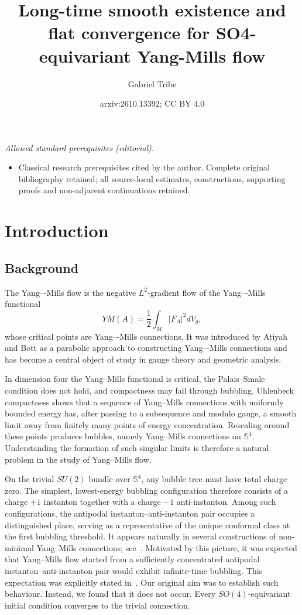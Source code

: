 \documentclass[11pt,a4paper]{article}
\title{Long-time smooth existence and flat convergence for SO4-equivariant Yang-Mills flow}
\author{Gabriel Tribe}
\date{arxiv:2610.13392; CC BY 4.0}
\numberwithin{equation}{section}
\theoremstyle{plain}
\theoremstyle{remark}
\begin{document}
\maketitle
\noindent\textit{Allowed standard prerequisites (editorial).}\begin{itemize}
\item Classical research prerequisites cited by the author. Complete original bibliography retained; all source-local estimates, constructions, supporting proofs and non-adjacent continuations retained.
\end{itemize}\medskip
\section{Introduction}

\subsection{Background}

The Yang–-Mills flow is the negative $L^2$-gradient flow of the Yang–-Mills functional
$$
YM(A)=\frac 1 2\int_M |F_A|^2dV_g,
$$
whose critical points are Yang–-Mills connections. It was introduced by Atiyah and Bott as a parabolic approach to constructing Yang–-Mills connections and has become a central object of study in gauge theory and geometric analysis.

In dimension four the Yang--Mills functional is critical, the Palais--Smale
condition does not hold, and compactness may fail through bubbling.
Uhlenbeck compactness shows that a sequence of Yang--Mills connections with
uniformly bounded energy has, after passing to a subsequence and modulo gauge,
a smooth limit away from finitely many points of energy concentration.
Rescaling around these points produces bubbles, namely Yang--Mills connections on $\mathbb S^4$. Understanding the formation of such singular limits is therefore a natural problem in the study of Yang--Mills flow.

On the trivial $SU(2)$ bundle over $\mathbb S^4$, any bubble tree must have total charge zero. The simplest, lowest-energy bubbling configuration therefore consists of a charge $+1$ instanton together with a charge $-1$ anti-instanton. Among such configurations, the antipodal instanton--anti-instanton pair occupies a distinguished place, serving as a representative of the unique conformal class at the first bubbling threshold. It appears naturally in several constructions of non-minimal Yang--Mills connections; see~\cite{Parker1992NonMinimal,SibnerSibnerUhlenbeck1989,Wang1997MorseYM}. Motivated by this picture, it was expected that Yang–Mills flow started from a sufficiently concentrated antipodal instanton--anti-instanton pair would exhibit infinite-time bubbling. This expectation was explicitly stated in~\cite{Wang1997MorseYM,Sadun1994SymmetricFamily}. Our original aim was to establish such behaviour. Instead, we found that it does not occur. Every $SO(4)$-equivariant initial condition converges to the trivial connection.
\end{document}
